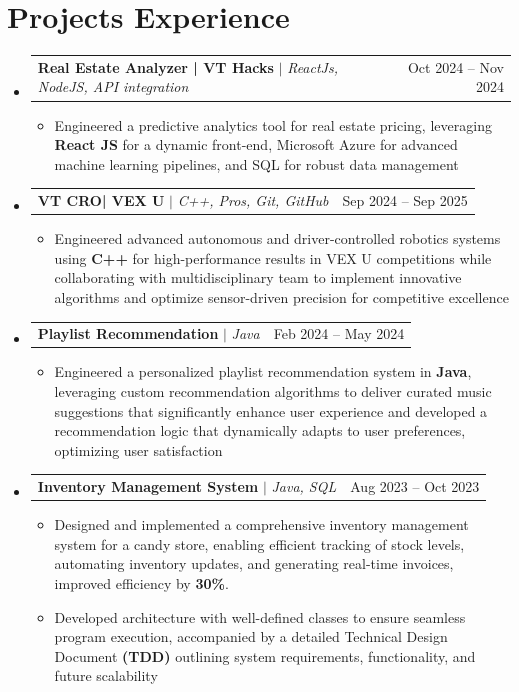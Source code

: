\documentclass[a4paper,11pt]{article}
\makeatletter
\newcommand{\resumeItem}[1]{
  \item\small{
    {#1 \vspace{-2pt}}
  }
}
\newcommand{\resumeProjectHeading}[2]{
    \item
    \begin{tabular*}{0.97\textwidth}{l@{\extracolsep{\fill}}r}
      \small#1 & #2 \\
    \end{tabular*}\vspace{-7pt}
}
\newcommand{\resumeSubHeadingListStart}{\begin{itemize}[leftmargin=0.15in, label={}]}
\newcommand{\resumeSubHeadingListEnd}{\end{itemize}}
\newcommand{\resumeItemListStart}{\begin{itemize}}
\newcommand{\resumeItemListEnd}{\end{itemize}\vspace{-8pt}} %
\makeatother
\begin{document}
\section{Projects Experience}
    \resumeSubHeadingListStart
      \resumeProjectHeading
        {\textbf{Real Estate Analyzer | VT Hacks} $|$ \emph{ReactJs, NodeJS, API integration}} {Oct 2024 -- Nov 2024}
        \resumeItemListStart
         \resumeItem{Engineered a predictive analytics tool for real estate pricing, leveraging \textbf{React JS} for a dynamic front-end, Microsoft Azure for advanced machine learning pipelines, and SQL for robust data management}
        \resumeItemListEnd
      \resumeProjectHeading
        {\textbf{VT CRO| VEX U} $|$ \emph{C++, Pros, Git, GitHub}}{Sep 2024 -- Sep 2025}
        \resumeItemListStart
         \resumeItem{Engineered advanced autonomous and driver-controlled robotics systems using \textbf{C++} for high-performance results in VEX U competitions while collaborating with multidisciplinary team to implement innovative algorithms and optimize sensor-driven precision for competitive excellence}
        \resumeItemListEnd
      \resumeProjectHeading
        {\textbf{Playlist Recommendation} $|$ \emph{Java}}{Feb 2024 -- May 2024}
        \resumeItemListStart
         \resumeItem{Engineered a personalized playlist recommendation system in \textbf{Java}, leveraging custom recommendation algorithms to deliver curated music suggestions that significantly enhance user experience and developed a recommendation logic that dynamically adapts to user preferences, optimizing user satisfaction}
        \resumeItemListEnd
      \resumeProjectHeading
        {\textbf{Inventory Management System} $|$ \emph{Java, SQL}}{Aug 2023 -- Oct 2023}
        \resumeItemListStart
         \resumeItem{Designed and implemented a comprehensive inventory management system for a candy store, enabling efficient tracking of stock levels, automating inventory updates, and generating real-time invoices, improved efficiency by \textbf{30\%}.}
         \resumeItem{Developed architecture with well-defined classes to ensure seamless program execution, accompanied by a detailed Technical Design Document \textbf{(TDD)} outlining system requirements, functionality, and future scalability}
        \resumeItemListEnd
    \resumeSubHeadingListEnd

\end{document}
